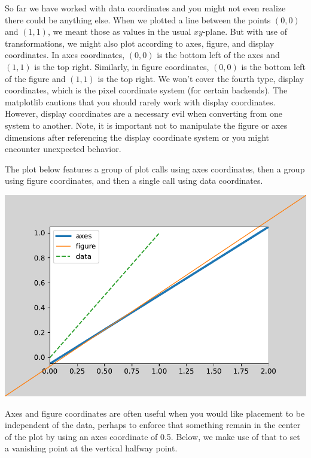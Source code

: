 So far we have worked with data coordinates and you might not even realize there could be anything else. When we plotted a line between the points $(0,0)$ and $(1,1)$, we meant those as values in the usual $xy$-plane. But with use of transformations, we might also plot according to axes, figure, and display coordinates. In axes coordinates, $(0,0)$ is the bottom left of the axes and $(1,1)$ is the top right. Similarly, in figure coordinates, $(0,0)$ is the bottom left of the figure and $(1,1)$ is the top right. We won't cover the fourth type, display coordinates, which is the pixel coordinate system (for certain backends). The matplotlib  cautions that you should rarely work with display coordinates. However, display coordinates are a necessary evil when converting from one system to another. Note, it is important not to manipulate the figure or axes dimensions after referencing the display coordinate system or you might encounter unexpected behavior. 

The plot below features a group of plot calls using axes coordinates, then a group using figure coordinates, and then a single call using data coordinates. 

\begin{center}
    \includegraphics[width = .8\textwidth]{figures/proseplots/coords.pdf}
\end{center}


Axes and figure coordinates are often useful when you would like placement to be independent of the data, perhaps to enforce that something remain in the center of the plot by using an axes coordinate of 0.5. Below, we make use of that to set a vanishing point at the vertical halfway point.


